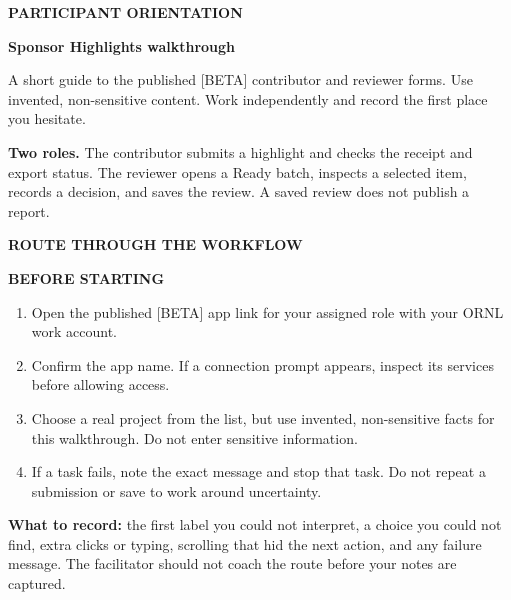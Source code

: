 \documentclass[letterpaper,10pt]{article}
\newcommand{\eyebrow}[1]{{\color{Green}\small\bfseries #1}\par\vspace{2pt}}
\newcommand{\titleline}[1]{{\color{Forest}\fontsize{22}{26}\selectfont\bfseries #1}\par\vspace{5pt}}
\newcommand{\subline}[1]{{\color{Muted}\small #1}\par\vspace{9pt}}
\begin{document}
\eyebrow{PARTICIPANT ORIENTATION}
\titleline{Sponsor Highlights walkthrough}
\subline{A short guide to the published [BETA] contributor and reviewer forms. Use invented, non-sensitive content. Work independently and record the first place you hesitate.}

\begin{note}
\textbf{Two roles.} The contributor submits a highlight and checks the receipt and export status. The reviewer opens a Ready batch, inspects a selected item, records a decision, and saves the review. A saved review does not publish a report.
\end{note}

\vspace{12pt}
\eyebrow{ROUTE THROUGH THE WORKFLOW}

\vspace{16pt}
\eyebrow{BEFORE STARTING}
\begin{enumerate}[leftmargin=20pt,itemsep=6pt]
\item Open the published [BETA] app link for your assigned role with your ORNL work account.
\item Confirm the app name. If a connection prompt appears, inspect its services before allowing access.
\item Choose a real project from the list, but use invented, non-sensitive facts for this walkthrough. Do not enter sensitive information.
\item If a task fails, note the exact message and stop that task. Do not repeat a submission or save to work around uncertainty.
\end{enumerate}
\begin{note}
\textbf{What to record:} the first label you could not interpret, a choice you could not find, extra clicks or typing, scrolling that hid the next action, and any failure message. The facilitator should not coach the route before your notes are captured.
\end{note}
\newpage
\end{document}
